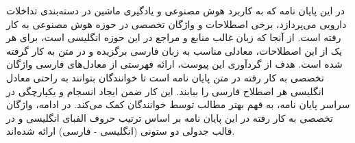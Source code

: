 \label{appendix:glossary}

در این پایان نامه که به کاربرد هوش مصنوعی و یادگیری ماشین در دسته‌بندی تداخلات دارویی می‌پردازد، برخی اصطلاحات و واژگان تخصصی در حوزه هوش مصنوعی به کار رفته است. از آنجا که زبان غالب منابع و مراجع در این حوزه انگلیسی است، برای هر یک از این اصطلاحات، معادلی مناسب به زبان فارسی برگزیده و در متن به کار گرفته شده است. هدف از گردآوری این پیوست، ارائه فهرستی از معادل‌های فارسی واژگان تخصصی به کار رفته در متن پایان نامه است تا خوانندگان بتوانند به راحتی معادل انگلیسی هر اصطلاح فارسی را بیابند. این کار ضمن ایجاد انسجام و یکپارچگی در سراسر پایان نامه، به فهم بهتر مطالب توسط خوانندگان کمک می‌کند. در ادامه، واژگان تخصصی به کار رفته در این پایان نامه بر اساس ترتیب حروف الفبای انگلیسی و در قالب جدولی دو ستونی (انگلیسی - فارسی) ارائه شده‌اند.

\vspace{1cm}

\setlength{\arrayrulewidth}{0.8pt} %


